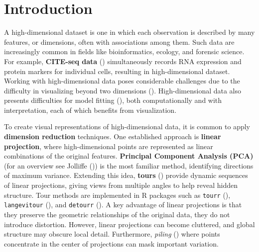 \documentclass[
  11pt,
  a4paper,
]{report}
\begin{document}
\clearpage{}\setcounter{page}{0}


\chapter{Introduction}\label{sec-intro}

A high-dimensional dataset is one in which each observation is described
by many features, or dimensions, often with associations among them.
Such data are increasingly common in fields like bioinformatics,
ecology, and forensic science. For example, \textbf{CITE-seq data}
() simultaneously records RNA
expression and protein markers for individual cells, resulting in
high-dimensional dataset. Working with high-dimensional data poses
considerable challenges due to the difficulty in visualizing beyond two
dimensions (). High-dimensional
data also presents difficulties for model fitting
(), both
computationally and with interpretation, each of which benefits from
visualization.

To create visual representations of high-dimensional data, it is common
to apply \textbf{dimension reduction} techniques. One established
approach is \textbf{linear projection}, where high-dimensional points
are represented as linear combinations of the original features.
\textbf{Principal Component Analysis (PCA)} (for an overview see
Jolliffe ()) is the most familiar
method, identifying directions of maximum variance. Extending this idea,
\textbf{tours} () provide dynamic
sequences of linear projections, giving views from multiple angles to
help reveal hidden structure. Tour methods are implemented in R packages
such as \texttt{tourr} (), \texttt{langevitour} (), and \texttt{detourr} (). A key advantage of linear projections is that they preserve the
geometric relationships of the original data, they do not introduce
distortion. However, linear projections can become cluttered, and global
structure may obscure local detail. Furthermore, \emph{piling}
() where points concentrate in
the center of projections can mask important variation.
\end{document}
